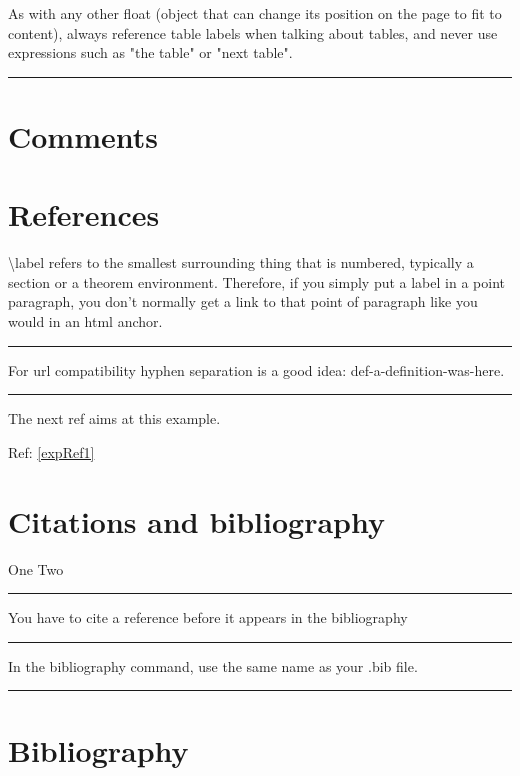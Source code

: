 \documentclass[12pt]{article}
\newcommand{\inOut}[1]{#1} %
\begin{document}
\begin{remark} \label{remTab3}
  As with any other float (object that can change its position on the page to fit to content), always reference table labels when talking about tables, and never use expressions such as "the table" or "next table".
\end{remark}\hrule

\section{Comments}\label{secCom}



\section{References}\label{secRef}

\begin{remark} \label{remLab1}
	\textbackslash{}label refers to the smallest surrounding thing that is numbered, typically a section or a theorem environment. Therefore, if you simply put a label in a point paragraph, you don't normally get a link to that point of paragraph like you would in an html anchor.
\end{remark}\hrule

\begin{remark} \label{remLab2}
  For url compatibility hyphen separation is a good idea: def-a-definition-was-here.
\end{remark}\hrule

\begin{example} \label{expRef1}
	\inOut{
		The next ref aims at this example.
		
		Ref: \ref{expRef1}
	}
\end{example}

\section{Citations and bibliography}\label{secCit}

\begin{example} \label{expCite1}
\inOut{One \cite{LL00} Two \cite{LL01}}
\end{example}\hrule

\begin{remark} \label{remCite1}
  You have to cite a reference before it appears in the bibliography
\end{remark}\hrule

\begin{remark} \label{remCite2}
  In the bibliography command, use the same name as your .bib file.
\end{remark}\hrule

\section{Bibliography}\label{secBib}
\newpage

\end{document}
